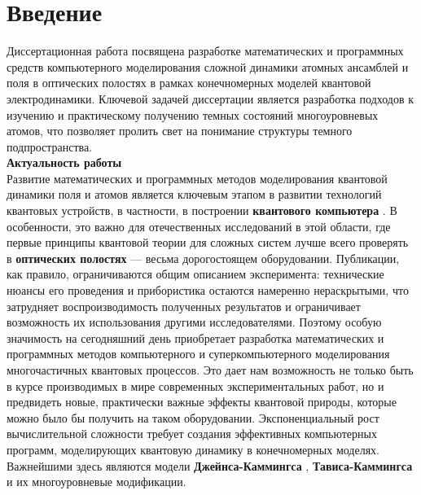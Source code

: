 \chapter*{Введение}                         %

\newcommand{\actuality}{}
\newcommand{\progress}{}
\newcommand{\aim}{{\textbf\aimTXT}}
\newcommand{\tasks}{\textbf{\tasksTXT}}
\newcommand{\novelty}{\textbf{\noveltyTXT}}
\newcommand{\influence}{\textbf{\influenceTXT}}
\newcommand{\contribution}{\textbf{\contributionTXT}}
\newcommand{\publications}{\textbf{\publicationsTXT}}

Диссертационная работа посвящена разработке математических и про­граммных средств компьютерного моделирования сложной динамики атомных ансамблей и поля в оптических полостях в рамках конечномерных моделей квантовой электродинамики. Ключевой задачей диссертации является разра­ботка подходов к изучению и практическому получению темных состояний многоуровневых атомов, что позволяет пролить свет на понимание структуры темного подпространства.
\\[24pt]
\indent\textbf{Актуальность работы}\\
\indent Развитие математических и программных методов моделирования кванто­вой динамики поля и атомов является ключевым этапом в развитии технологий квантовых устройств, в частности, в построении \textbf{квантового компьютера} \cite{feynman,zalka,valiev_1,valiev_2}. В особенности, это важно для отечественных исследований в этой об­ласти, где первые принципы квантовой теории для сложных систем лучше всего проверять в \textbf{оптических полостях} \cite{cavity_exp_1,cavity_exp_2} --- весьма дорогостоящем оборудовании. Публикации, как правило, ограничиваются общим описанием эксперимента: технические нюансы его проведения и прибористика остают­ся намеренно нераскрытыми, что затрудняет воспроизводимость полученных результатов и ограничивает возможность их использования другими иссле­дователями. Поэтому особую значимость на сегодняшний день приобретает разработка математических и программных методов компьютерного и супер­компьютерного моделирования многочастичных квантовых процессов. Это дает нам возможность не только быть в курсе производимых в мире современных экс­периментальных работ, но и предвидеть новые, практически важные эффекты квантовой природы, которые можно было бы получить на таком оборудова­нии. Экспоненциальный рост вычислительной сложности \cite{feynman} требует создания эффективных компьютерных программ, моделирующих квантовую динамику в конечномерных моделях. Важнейшими здесь являются модели \textbf{Джейнса-Кам­мингса} \cite{jc_comparison}, \textbf{Тависа-Каммингса} \cite{tc_exact_solution,tc_a_study} и их многоуровневые модификации.

